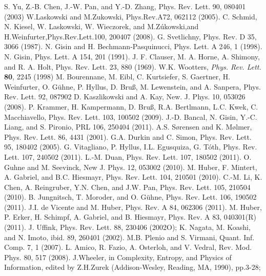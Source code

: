 \begin{thebibliography}{}
  S. Yu, Z.-B. Chen, J.-W. Pan, and Y.-D. Zhang, Phys. Rev. Lett. 90, 080401 (2003)
  W.Laskowski and M.Zukowski, Phys.Rev.A72, 062112 (2005).
  C. Schmid, N. Kiesel, W. Laskowski, W. Wieczorek, and M.Z\'ukowski,and H.Weinfurter,Phys.Rev.Lett.100, 200407 (2008).
  G. Svetlichny, Phys. Rev. D 35, 3066 (1987).
  N. Gisin and H. Bechmann-Pasquinucci, Phys. Lett. A 246, 1 (1998).
  N. Gisin, Phys. Lett. A 154, 201 (1991).
  J. F. Clauser, M. A. Horne, A. Shimony, and R. A. Holt, Phys. Rev. Lett. 23, 880 (1969).
  W.K. Wootters, \textit{Phys. Rev. Lett.} \textbf{80}, 2245 (1998)
  M. Bourennane, M. Eibl, C. Kurtsiefer, S. Gaertner, H. Weinfurter, O. G\"uhne, P. Hyllus, D. Bruß, M. Lewenstein, and A. Sanpera, Phys. Rev. Lett. 92, 087902
  D. Kaszlikowski and A. Kay, New. J. Phys. 10, 053026 (2008).
  P. Krammer, H. Kampermann, D. Bruß, R.A. Bertlmann, L.C. Kwek, C. Macchiavello, Phys. Rev. Lett. 103, 100502 (2009).
  J.-D. Bancal, N. Gisin, Y.-C. Liang, and S. Pironio, PRL 106, 250404 (2011).
  A.S. Sørensen and K. Mølmer, Phys. Rev. Lett. 86, 4431 (2001).
  G.A. Durkin and C. Simon, Phys. Rev. Lett. 95, 180402 (2005).
  G. Vitagliano, P. Hyllus, I.L. Egusquiza, G. T\'oth, Phys. Rev. Lett. 107, 240502 (2011).
  L.-M. Duan, Phys. Rev. Lett. 107, 180502 (2011).
  O. Guhne and M. Seevinck, New J. Phys. 12, 053002 (2010).
  M. Huber, F. Mintert, A. Gabriel, and B.C. Hiesmayr, Phys. Rev. Lett. 104, 210501 (2010).
  C.-M. Li, K. Chen, A. Reingruber, Y.N. Chen, and J.W. Pan, Phys. Rev. Lett. 105, 210504 (2010).
  B. Jungnitsch, T. Moroder, and O. G\"uhne, Phys. Rev. Lett. 106, 190502 (2011).
  J.I. de Vicente and M. Huber, Phys. Rev. A 84, 062306 (2011).
  M. Huber, P. Erker, H. Schimpf, A. Gabriel, and B. Hiesmayr, Phys. Rev. A 83, 040301(R) (2011).
   J. Uffink, Phys. Rev. Lett. 88, 230406 (2002O); K. Nagata, M. Koashi, and N. Imoto, ibid. 89, 260401 (2002).
  M.B. Plenio and S. Virmani, Quant. Inf. Comp. 7, 1 (2007).
  L. Amico, R. Fazio, A. Osterloh, and V. Vedral, Rev. Mod. Phys. 80, 517 (2008).
  J.Wheeler, in Complexity, Entropy, and Physics of Information, edited by Z.H.Zurek (Addison-Wesley, Reading, MA, 1990), pp.3-28;

\end{thebibliography}
